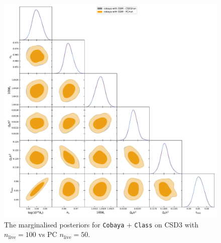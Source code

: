\documentclass[usenatbib]{mnras}
\begin{document}
\begin{landscape}
\begin{figure}
  \centering %
  \includegraphics[height=0.95\textheight]{./illustrations/cosmo-pc.pdf}
  \caption{The marginalised posteriors for \texttt{Cobaya} +
    \texttt{Class} on CSD3 with \(n_\text{live}=100\) vs PC
    \(n_\text{live}=50\). } \label{fig:cosmology-pc}
\end{figure}
\end{landscape}





\end{document}
